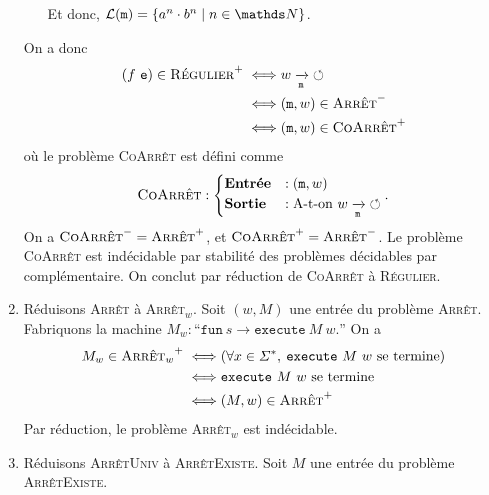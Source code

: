 \begin{enumerate}
\begin{itemize}
\begin{itemize}
				\end{itemize}
				Et donc, $\mathcal{L}(\texttt{m}) = \{a^n \cdot b^n  \mid n \in \N\}$.
		\end{itemize}
		On a donc
		\begin{align*}
			(f\ \texttt{e}) \in \textsc{Régulier}^+ \iff& w \xrightarrow[\texttt{m}]{} {\circlearrowleft}\\
			\iff& (\texttt{m}, w) \in \textsc{Arrêt}^-\\
			\iff& (\texttt{m},w) \in \textsc{CoArrêt}^+
		\end{align*}
		où le problème \textsc{CoArrêt} est défini comme \[
			\textsc{CoArrêt} : \begin{cases}
				\text{\textbf{Entrée}} &: (\texttt{m},w)\\
				\text{\textbf{Sortie}}&: \text{A-t-on } w \xrightarrow[\texttt{m}]{}{\circlearrowleft}
			\end{cases}
		.\]
		On a $\textsc{CoArrêt}^- = \textsc{Arrêt}^+$, et $\textsc{CoArrêt}^+ = \textsc{Arrêt}^-$. Le problème \textsc{CoArrêt} est indécidable par stabilité des problèmes décidables par complémentaire. On conclut par réduction de \textsc{CoArrêt} à \textsc{Régulier}.
	\item Réduisons \textsc{Arrêt} à \textsc{Arrêt}$_w$. Soit $(w, M)$ une entrée du problème \textsc{Arrêt}.
		Fabriquons la machine $M_w : \text{``}\texttt{fun}\ s \to \texttt{execute}\ M\ w .\text{''}$\@
		On a
		\begin{align*}
			M_w \in {\textsc{Arrêt}_w}^+ \iff& (\forall x \in \Sigma^*,\:\texttt{execute}\ M\ w \text{ se termine})\\
			\iff& \texttt{execute}\ M\ w \text{ se termine}\\
			\iff& (M, w) \in \textsc{Arrêt}^+
		\end{align*}
		Par réduction, le problème \textsc{Arrêt}$_w$ est indécidable.
	\item Réduisons \textsc{ArrêtUniv} à \textsc{ArrêtExiste}. Soit $M$\/ une entrée du problème \textsc{ArrêtExiste}.
\end{enumerate}

